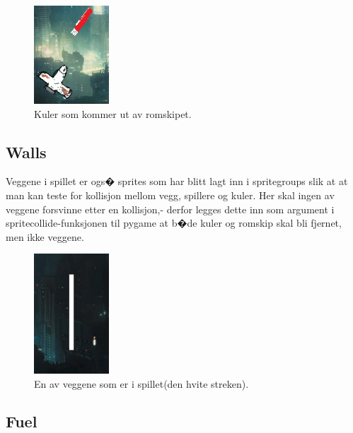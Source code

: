{\begin{figure}[hbt!]
{\centering
    \includegraphics[width=0.25\textwidth]{kuler.jpg}
    \caption{Kuler som kommer ut av romskipet.}
    \label{Kuler}
\par}
\end{figure}


\subsection{Walls}

Veggene i spillet er ogs� sprites som har blitt lagt inn i spritegroups slik at at man kan teste for kollisjon mellom vegg, spillere og kuler. Her skal ingen av veggene forsvinne etter en kollisjon,- derfor legges dette inn som argument i spritecollide-funksjonen til pygame at b�de kuler og romskip skal bli fjernet, men ikke veggene. 

\begin{figure}[hbt!]
    {\centering
        \includegraphics[width=0.25\textwidth]{vegg.jpg}
        \caption{En av veggene som er i spillet(den hvite streken).}
        \label{vegg}
    \par}
    \end{figure}





\subsection{Fuel}

}
